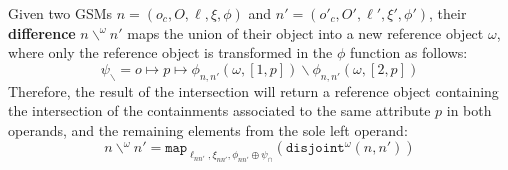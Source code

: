 \begin{definition}[Difference]
	Given two GSMs  $n=(o_c,O,\ell,\xi,\phi)$ and $n'=(o'_c,O',\ell',\xi',\phi')$, their \textbf{difference} $n\backslash^\omega n'$ maps the union of their object into a new reference object $\omega$, where only the reference object is transformed in the $\phi$ function as follows:
	\[\psi_\backslash=o\mapsto p\mapsto \phi_{n,n'}(\omega, [1,p])\backslash\phi_{n,n'}(\omega, [2,p])\]
	Therefore, the result of the intersection will return a reference object containing the intersection of the containments associated to the same attribute $p$ in both operands, and the remaining elements from the sole left operand:
	\[n\backslash^\omega n'=\texttt{map}_{\ell_{nn'},\xi_{nn'},\phi_{nn'}\oplus \psi_\cap}(\texttt{disjoint}^\omega(n,n'))\]
\end{definition}

